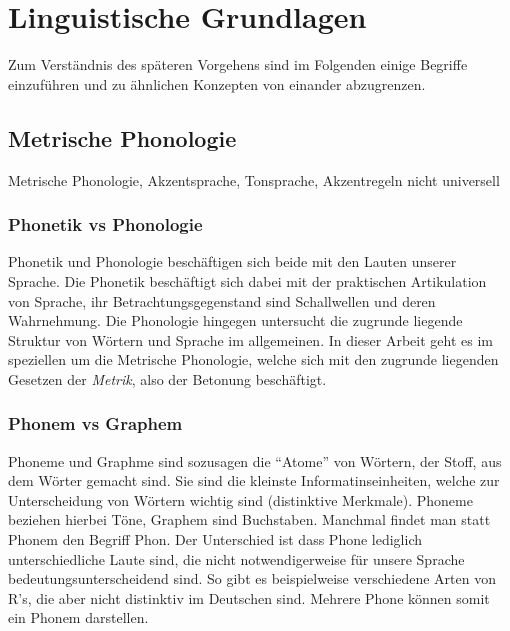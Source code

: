 \chapter{Linguistische Grundlagen}




Zum Verständnis des späteren Vorgehens sind im Folgenden einige Begriffe einzuführen und zu ähnlichen Konzepten von einander abzugrenzen.

\section{Metrische Phonologie}

Metrische Phonologie, Akzentsprache, Tonsprache, Akzentregeln nicht universell \cite[S.~277]{Hall2011}




\subsection{Phonetik vs Phonologie}
Phonetik und Phonologie beschäftigen sich beide mit den Lauten unserer Sprache. Die Phonetik beschäftigt sich dabei mit der praktischen Artikulation von Sprache, ihr Betrachtungsgegenstand sind Schallwellen und deren Wahrnehmung. Die Phonologie hingegen untersucht die zugrunde liegende Struktur von Wörtern und Sprache im allgemeinen. In dieser Arbeit geht es im speziellen um die Metrische Phonologie, welche sich mit den zugrunde liegenden Gesetzen der \textit{Metrik}, also der Betonung beschäftigt. \cite[S. Todo]{Hall2011}

\subsection{Phonem vs Graphem}
Phoneme und Graphme sind sozusagen die \enquote{Atome} von Wörtern, der Stoff, aus dem Wörter gemacht sind. Sie sind die kleinste Informatinseinheiten, welche zur Unterscheidung von Wörtern wichtig sind (distinktive Merkmale). Phoneme beziehen hierbei Töne, Graphem sind Buchstaben.
Manchmal findet man statt Phonem den Begriff Phon. Der Unterschied ist dass Phone lediglich unterschiedliche Laute sind, die nicht notwendigerweise für unsere Sprache bedeutungsunterscheidend sind. So gibt es beispielweise verschiedene Arten von R's, die aber nicht distinktiv im Deutschen sind. Mehrere Phone können somit ein Phonem darstellen. \cite[S.~Todo]{Hall2011}

